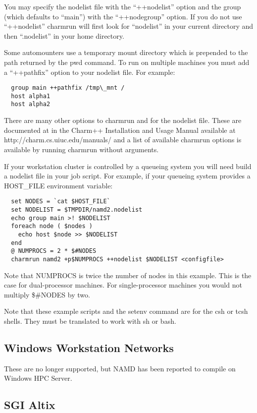 You may specify the nodelist file with the ``++nodelist'' option and the
group (which defaults to ``main'') with the ``++nodegroup'' option.  If
you do not use ``++nodelist'' charmrun will first look for ``nodelist''
in your current directory and then ``.nodelist'' in your home directory.

Some automounters use a temporary mount directory which is prepended
to the path returned by the pwd command.  To run on multiple machines
you must add a ``++pathfix'' option to your nodelist file.  For example:

\begin{verbatim}
  group main ++pathfix /tmp\_mnt /
  host alpha1
  host alpha2
\end{verbatim}

There are many other options to charmrun and for the nodelist file.
These are documented at in the Charm++ Installation and Usage Manual
available at http://charm.cs.uiuc.edu/manuals/ and a list of available
charmrun options is available by running charmrun without arguments.

If your workstation cluster is controlled by a queueing system you
will need build a nodelist file in your job script.  For example, if
your queueing system provides a HOST\_FILE environment variable:

\begin{verbatim}
  set NODES = `cat $HOST_FILE`
  set NODELIST = $TMPDIR/namd2.nodelist
  echo group main >! $NODELIST
  foreach node ( $nodes )
    echo host $node >> $NODELIST
  end
  @ NUMPROCS = 2 * $#NODES
  charmrun namd2 +p$NUMPROCS ++nodelist $NODELIST <configfile>
\end{verbatim}

Note that NUMPROCS is twice the number of nodes in this example.
This is the case for dual-processor machines.  For single-processor
machines you would not multiply \$\#NODES by two.

Note that these example scripts and the setenv command are for the csh
or tcsh shells.  They must be translated to work with sh or bash.

\subsection{Windows Workstation Networks}

These are no longer supported, but NAMD has been reported to compile
on Windows HPC Server.

\subsection{SGI Altix}

